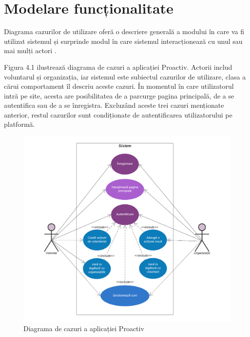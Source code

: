 \documentclass[12pt,a4paper]{report}
\begin{document}
\section{Modelare funcționalitate}
\par
Diagrama cazurilor de utilizare oferă o descriere generală a modului în care va fi utilizat sistemul și surprinde modul în care sistemul interacționează cu unul sau mai mulți actori \cite{usecases}.
\\
\par
Figura 4.1 ilustrează diagrama de cazuri a aplicației Proactiv. Actorii includ voluntarul și organizația, iar sistemul este subiectul cazurilor de utilizare, clasa a cărui comportament îl descriu aceste cazuri. 
În momentul în care utilizatorul intră pe site, acesta are posibilitatea de a parcurge pagina principală, de a se autentifica sau de a se înregistra. Excluzând aceste trei cazuri menționate anterior, restul cazurilor sunt condiționate de autentificarea utilizatorului pe platformă.
\\
\begin{figure}[h!]
  \centering
    \includegraphics[width=0.7\linewidth]{./imagini/UseCase.png}
    \caption{Diagrama de cazuri a aplicației Proactiv}
\end{figure}
\end{document}
